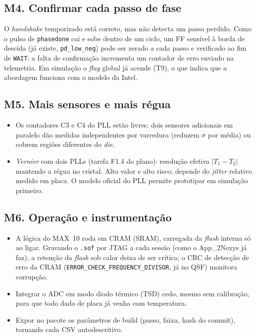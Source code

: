 \documentclass[11pt,a4paper]{article}
\begin{document}
\subsection{M4. Confirmar cada passo de fase}
O \emph{handshake} temporizado está correto, mas não detecta um passo perdido. Como o pulso de
\texttt{phasedone} cai e sobe dentro de um ciclo, um FF sensível à borda de descida (já existe,
\texttt{pd\_low\_neg}) pode ser zerado a cada passo e verificado ao fim de \texttt{WAIT}; a falta de
confirmação incrementa um contador de erro enviado na telemetria. Em simulação o \emph{flag}
global já acende (T9), o que indica que a abordagem funciona com o modelo da Intel.

\subsection{M5. Mais sensores e mais régua}
\begin{itemize}
  \item Os contadores C3 e C4 do PLL estão livres: dois sensores adicionais em paralelo dão
        medidas independentes por varredura (reduzem $\sigma$ por média) ou cobrem regiões
        diferentes do \emph{die}.
  \item \emph{Vernier} com dois PLLs (tarefa F1.4 do plano): resolução efetiva $|T_1 - T_2|$
        mantendo a régua no cristal. Alto valor e alto risco; depende do \emph{jitter} relativo
        medido em placa. O modelo oficial do PLL permite prototipar em simulação primeiro.
\end{itemize}

\subsection{M6. Operação e instrumentação}
\begin{itemize}
  \item A lógica do MAX~10 roda em CRAM (SRAM), carregada da \emph{flash} interna só ao ligar.
        Gravando o \texttt{.sof} por JTAG a cada sessão (como o App\_2Nexys já faz), a retenção
        da \emph{flash} sob calor deixa de ser crítica; o CRC de detecção de erro da CRAM
        (\texttt{ERROR\_CHECK\_FREQUENCY\_DIVISOR}, já no QSF) monitora corrupção.
  \item Integrar o ADC em modo diodo térmico (TSD) cedo, mesmo sem calibração, para que todo
        dado de placa já venha com temperatura.
  \item Expor no pacote os parâmetros de build (passo, faixa, hash do commit), tornando cada
        CSV autodescritivo.
\end{itemize}
\end{document}
